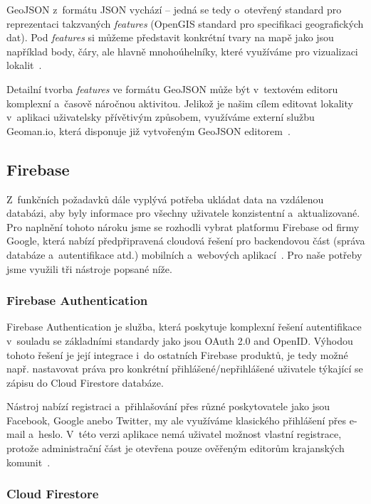 GeoJSON z~formátu JSON vychází -- jedná se tedy o~otevřený standard pro reprezentaci takzvaných \emph{features} (OpenGIS standard pro specifikaci geografických dat). Pod \emph{features} si můžeme představit konkrétní tvary na mapě jako jsou například body, čáry, ale hlavně mnohoúhelníky, které využíváme pro vizualizaci lokalit~\parencite{geojson}.

Detailní tvorba \emph{features} ve formátu GeoJSON může být v~textovém editoru komplexní a~časově náročnou aktivitou. Jelikož je našim cílem editovat lokality v~aplikaci uživatelsky přívětivým způsobem, využíváme externí službu Geoman.io, která disponuje již vytvořeným GeoJSON editorem~\parencite{geoman}.

\hypertarget{firebase}{%
\subsection{Firebase}\label{firebase}}

Z~funkčních požadavků dále vyplývá potřeba ukládat data na vzdálenou databázi, aby byly informace pro všechny uživatele konzistentní a~aktualizované. Pro naplnění tohoto nároku jsme se rozhodli vybrat platformu Firebase od firmy Google, která nabízí předpřipravená cloudová řešení pro backendovou část (správa databáze a~autentifikace atd.) mobilních a~webových aplikací~\parencite{firebase}. Pro naše potřeby jsme využili tři nástroje popsané níže.

\hypertarget{firebase-authentication}{%
\subsubsection{Firebase Authentication}\label{firebase-authentication}}

Firebase Authentication je služba, která poskytuje komplexní řešení autentifikace v~souladu se základními standardy jako jsou OAuth 2.0 and OpenID. Výhodou tohoto řešení je její integrace i~do ostatních Firebase produktů, je tedy možné např. nastavovat práva pro konkrétní přihlášené/nepřihlášené uživatele týkající se zápisu do Cloud Firestore databáze.

Nástroj nabízí registraci a~přihlašování přes různé poskytovatele jako jsou Facebook, Google anebo Twitter, my ale využíváme klasického přihlášení přes e-mail a~heslo. V~této verzi aplikace nemá uživatel možnost vlastní registrace, protože administrační část je otevřena pouze ověřeným editorům krajanských komunit~\parencite{auth}.

\hypertarget{cloud-firestore}{%
\subsubsection{Cloud Firestore}\label{cloud-firestore}}

